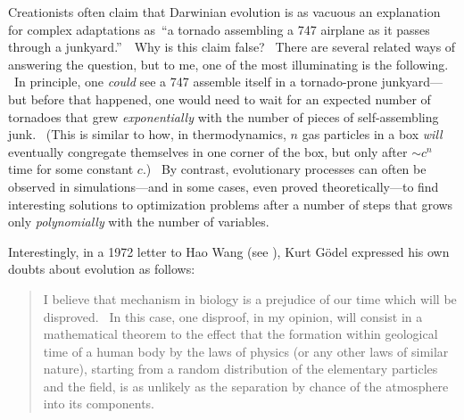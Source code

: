 \documentclass[12pt,onecolumn]{article}%
\begin{document}
Creationists often claim that Darwinian evolution is as vacuous an explanation
for complex adaptations as\ \textquotedblleft a tornado assembling a 747
airplane as it passes through a junkyard.\textquotedblright\ \ Why is this
claim false? \ There are several related ways of answering the question, but
to me, one of the most illuminating is the following. \ In principle, one
\textit{could} see a 747 assemble itself in a tornado-prone junkyard---but
before that happened, one would need to wait for an expected number of
tornadoes that grew \textit{exponentially} with the number of pieces of
self-assembling junk. \ (This is similar to how, in thermodynamics, $n$ gas
particles in a box \textit{will} eventually congregate themselves in one
corner of the box, but only after $\sim c^{n}$ time for some constant $c$.)
\ By contrast, evolutionary processes can often be observed in
simulations---and in some cases, even proved theoretically---to find
interesting solutions to optimization problems after a number of steps that
grows only \textit{polynomially} with the number of variables.

Interestingly, in a 1972 letter to Hao Wang (see \cite[p. 192]{wang}), Kurt
G\"{o}del expressed his own doubts about evolution as follows:

\begin{quotation}
\noindent I believe that mechanism in biology is a prejudice of our time which
will be disproved. \ In this case, one disproof, in my opinion, will consist
in a mathematical theorem to the effect that the formation within geological
time of a human body by the laws of physics (or any other laws of similar
nature), starting from a random distribution of the elementary particles and
the field, is as unlikely as the separation by chance of the atmosphere into
its components.
\end{quotation}
\end{document}

